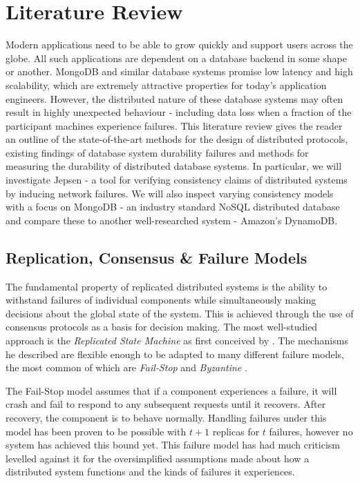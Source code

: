 \chapter{Literature Review} \label{chap:litreview}

Modern applications need to be able to grow quickly and support users across the globe. All such applications are dependent on a database backend in some shape or another. MongoDB and similar database systems promise low latency and high scalability, which are extremely attractive properties for today's application engineers. However, the distributed nature of these database systems may often result in highly unexpected behaviour - including data loss when a fraction of the participant machines experience failures. This literature review gives the reader an outline of the state-of-the-art methods for the design of distributed protocols, existing findings of database system durability failures and methods for measuring the durability of distributed database systems. In particular, we will investigate Jepsen - a tool for verifying consistency claims of distributed systems by inducing network failures. We will also inspect varying consistency models with a focus on MongoDB - an industry standard NoSQL distributed database and compare these to another well-researched system - Amazon's DynamoDB.

\section{Replication, Consensus \& Failure Models}
The fundamental property of replicated distributed systems is the ability to withstand failures of individual components while simultaneously making decisions about the global state of the system. This is achieved through the use of consensus protocols as a basis for decision making. The most well-studied approach is the \textit{Replicated State Machine} as first conceived by \citet{replicated-state-machine}. The mechanisms he described are flexible enough to be adapted to many different failure models, the most common of which are \textit{Fail-Stop} \citep{fail-stop} and \textit{Byzantine} \citep{byzantine}. 

The Fail-Stop model assumes that if a component experiences a failure, it will crash and fail to respond to any subsequent requests until it recovers. After recovery, the component is to behave normally. Handling failures under this model has been proven to be possible with $t+1$ replicas for $t$ failures, however no system has achieved this bound yet. This failure model has had much criticism levelled against it \citep{correlated-crash, gray-failure} for the oversimplified assumptions made about how a distributed system functions and the kinds of failures it experiences.

